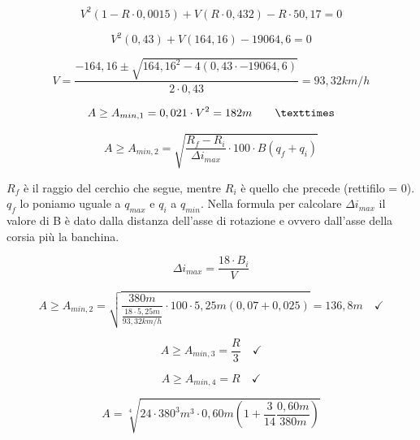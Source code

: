 \documentclass[
a4paper,
12pt, 
twoside]{scrbook}
\begin{document}
{{{{{{{{   \begin{equation}
   	V^2(1-R\cdot0,0015)+V(R\cdot 0,432)-R\cdot 50,17=0
   \end{equation} 	
   
   \begin{equation}
   	V^2(0,43)+V(164,16)-19064,6=0
   \end{equation} 	
   
   \begin{equation}
   	V=\frac{-164,16\pm \sqrt{164,16^2-4(0,43\cdot -19064,6)}}{2\cdot 0,43}=93,32km/h
   \end{equation} 	
   
   \begin{equation}
   	A\geq A_{min,1}=0,021\cdot V^2=182m\phantom{////} \texttimes 
   \end{equation} 	
   
   \begin{equation}
   	A\geq A_{min,2}=\sqrt{\frac{R_f-R_i}{\Delta i_{max}}\cdot 100\cdot B(q_f+q_i)}
   \end{equation} 	
   
  \begin{boxF}
   $R_f$ è il raggio del cerchio che segue, mentre $R_i$ è quello che precede (rettifilo = 0). $q_f$ lo poniamo uguale a $q_{max}$ e $q_i$ a $q_{min}$. Nella formula per calcolare $\Delta i_{max}$ il valore di B è dato dalla distanza dell'asse di rotazione e ovvero dall'asse della corsia più la banchina.
  \end{boxF}
  
  \begin{equation}
  	\Delta i_{max}=\frac{18\cdot B_i}{V}
  \end{equation} 	
   
  \begin{equation}
  	A\geq A_{min,2}=\sqrt{\frac{380m}{\frac{18\cdot 5,25m}{93,32km/h}}\cdot 100\cdot 5,25m(0,07+0,025)}=136,8m\phantom{//} \checkmark
  \end{equation} 	
  
  \begin{equation}
  	A\geq A_{min,3}=\frac{R}{3}\phantom{//} \checkmark
  \end{equation} 	
  
  \begin{equation}
  	A\geq A_{min,4}=R\phantom{//} \checkmark
  \end{equation} 	
  
  \begin{equation}
  	A=\sqrt[4]{24\cdot 380^3m^3\cdot 0,60m(1+\frac{3}{14}\frac{0,60m}{380m})}
  \end{equation} 	
  
}}}}}}}}
\end{document}
